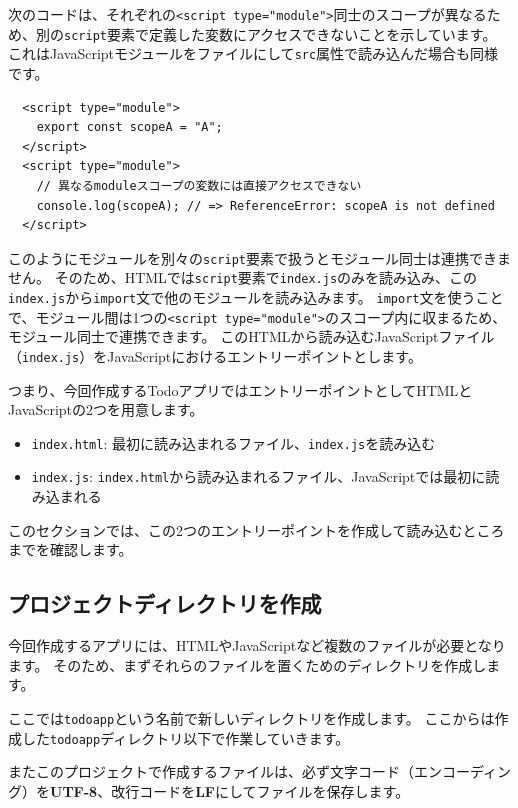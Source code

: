 次のコードは、それぞれの\texttt{<script type="module">}同士のスコープが異なるため、別の\texttt{script}要素で定義した変数にアクセスできないことを示しています。
これはJavaScriptモジュールをファイルにして\texttt{src}属性で読み込んだ場合も同様です。

\begin{lstlisting}
  <script type="module">
    export const scopeA = "A";
  </script>
  <script type="module">
    // 異なるmoduleスコープの変数には直接アクセスできない
    console.log(scopeA); // => ReferenceError: scopeA is not defined
  </script>
\end{lstlisting}

このようにモジュールを別々の\texttt{script}要素で扱うとモジュール同士は連携できません。
そのため、HTMLでは\texttt{script}要素で\texttt{index.js}のみを読み込み、この\texttt{index.js}から\texttt{import}文で他のモジュールを読み込みます。
\texttt{import}文を使うことで、モジュール間は1つの\texttt{<script type="module">}のスコープ内に収まるため、モジュール同士で連携できます。
このHTMLから読み込むJavaScriptファイル（\texttt{index.js}）をJavaScriptにおけるエントリーポイントとします。

つまり、今回作成するTodoアプリではエントリーポイントとしてHTMLとJavaScriptの2つを用意します。

\begin{itemize}
\item
  \texttt{index.html}:
  最初に読み込まれるファイル、\texttt{index.js}を読み込む
\item
  \texttt{index.js}:
  \texttt{index.html}から読み込まれるファイル、JavaScriptでは最初に読み込まれる
\end{itemize}

このセクションでは、この2つのエントリーポイントを作成して読み込むところまでを確認します。

\hypertarget{project-directory}{%
\subsection{プロジェクトディレクトリを作成}\label{project-directory}}

今回作成するアプリには、HTMLやJavaScriptなど複数のファイルが必要となります。
そのため、まずそれらのファイルを置くためのディレクトリを作成します。

ここでは\texttt{todoapp}という名前で新しいディレクトリを作成します。
ここからは作成した\texttt{todoapp}ディレクトリ以下で作業していきます。

またこのプロジェクトで作成するファイルは、必ず文字コード（エンコーディング）を\textbf{UTF-8}、改行コードを\textbf{LF}にしてファイルを保存します。

